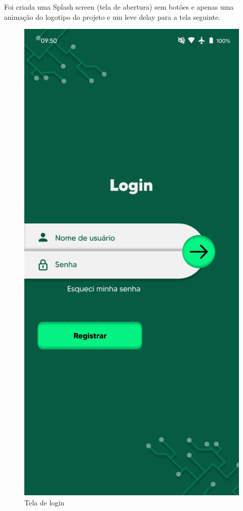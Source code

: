 Foi criada uma Splash screen (tela de abertura) sem botões e apenas uma animação do logotipo do projeto e um leve delay para a tela seguinte.

\begin{figure}[!h]
\centering
\caption{Tela de login}
\label{fig:picture2}
\includegraphics[scale=0.3]{Illustrations/Picture2.png}
\end{figure}
  
